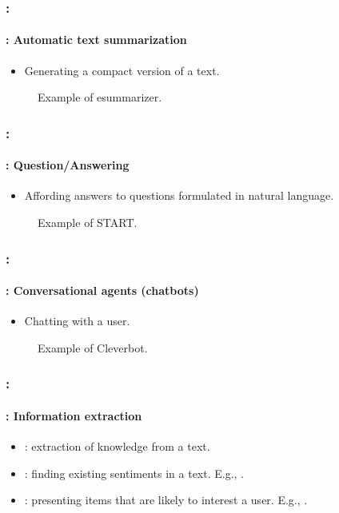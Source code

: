 \documentclass[xcolor=table]{beamer}
\begin{document}
\begin{frame}
	\frametitle{\insertshortsubtitle: \insertsection}
	\framesubtitle{\insertsubsection: Automatic text summarization}

	\begin{itemize}
		\item Generating a compact version of a text.
	\end{itemize}
	
	\begin{figure}
		\caption{Example of esummarizer.}
	\end{figure}

\end{frame}

\begin{frame}
	\frametitle{\insertshortsubtitle: \insertsection}
	\framesubtitle{\insertsubsection: Question/Answering}

	\begin{itemize}
		\item Affording answers to questions formulated in natural language.
	\end{itemize}
	
	\begin{figure}
		\caption{Example of START.}
	\end{figure}

\end{frame}

\begin{frame}
	\frametitle{\insertshortsubtitle: \insertsection}
	\framesubtitle{\insertsubsection: Conversational agents (chatbots)}

	\begin{itemize}
		\item Chatting with a user.
	\end{itemize}
	
	\begin{figure}
		\centering
		\caption{Example of Cleverbot.}
	\end{figure}

\end{frame}

\begin{frame}
	\frametitle{\insertshortsubtitle: \insertsection}
	\framesubtitle{\insertsubsection: Information extraction}

	\begin{itemize}
		\item {}: extraction of knowledge from a text.
		\item {}: finding existing sentiments in a text.
		E.g., .
		\item {}: presenting items that are likely to interest a user.
		E.g., .
	\end{itemize}

\end{frame}
\end{document}
